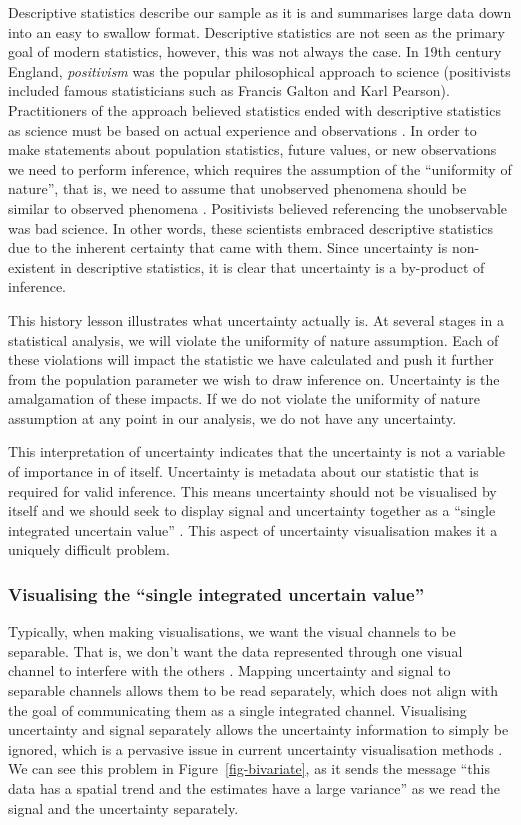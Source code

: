 \documentclass[
  12pt]{article}
\begin{document}
Descriptive statistics describe our sample as it is and summarises large
data down into an easy to swallow format. Descriptive statistics are not
seen as the primary goal of modern statistics, however, this was not
always the case. In 19th century England, \emph{positivism} was the
popular philosophical approach to science (positivists included famous
statisticians such as Francis Galton and Karl Pearson). Practitioners of
the approach believed statistics ended with descriptive statistics as
science must be based on actual experience and observations
\citep{Otsuka2023}. In order to make statements about population
statistics, future values, or new observations we need to perform
inference, which requires the assumption of the ``uniformity of
nature'', that is, we need to assume that unobserved phenomena should be
similar to observed phenomena \citep{Otsuka2023}. Positivists believed
referencing the unobservable was bad science. In other words, these
scientists embraced descriptive statistics due to the inherent certainty
that came with them. Since uncertainty is non-existent in descriptive
statistics, it is clear that uncertainty is a by-product of inference.

This history lesson illustrates what uncertainty actually is. At several
stages in a statistical analysis, we will violate the uniformity of
nature assumption. Each of these violations will impact the statistic we
have calculated and push it further from the population parameter we
wish to draw inference on. Uncertainty is the amalgamation of these
impacts. If we do not violate the uniformity of nature assumption at any
point in our analysis, we do not have any uncertainty.

This interpretation of uncertainty indicates that the uncertainty is not
a variable of importance in of itself. Uncertainty is metadata about our
statistic that is required for valid inference. This means uncertainty
should not be visualised by itself and we should seek to display signal
and uncertainty together as a ``single integrated uncertain value''
\citep{Kinkeldey2014}. This aspect of uncertainty visualisation makes it
a uniquely difficult problem.

\subsubsection{Visualising the ``single integrated uncertain
value''}\label{visualising-the-single-integrated-uncertain-value}

Typically, when making visualisations, we want the visual channels to be
separable. That is, we don't want the data represented through one
visual channel to interfere with the others \citep{Smart2019}. Mapping
uncertainty and signal to separable channels allows them to be read
separately, which does not align with the goal of communicating them as
a single integrated channel. Visualising uncertainty and signal
separately allows the uncertainty information to simply be ignored,
which is a pervasive issue in current uncertainty visualisation methods
\citep{uncertchap2022}. We can see this problem in
Figure~\ref{fig-bivariate}, as it sends the message ``this data has a
spatial trend and the estimates have a large variance'' as we read the
signal and the uncertainty separately.
\end{document}
